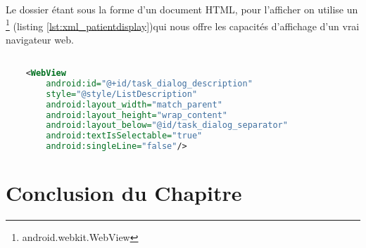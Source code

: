 Le dossier étant sous la forme d'un document HTML, pour l'afficher on utilise un \footnote{android.webkit.WebView} (listing \ref{lst:xml_patientdisplay})qui nous offre les capacités d'affichage d'un vrai navigateur web.


\begin{lstlisting}[language=xml, label=lst:xml_patientdisplay, caption=Déclaration XML du WebView utilisé par PatientDisplay]

    <WebView
        android:id="@+id/task_dialog_description"
        style="@style/ListDescription"
        android:layout_width="match_parent"
        android:layout_height="wrap_content"
        android:layout_below="@id/task_dialog_separator"
        android:textIsSelectable="true" 
        android:singleLine="false"/>

\end{lstlisting}

\section{Conclusion du Chapitre}